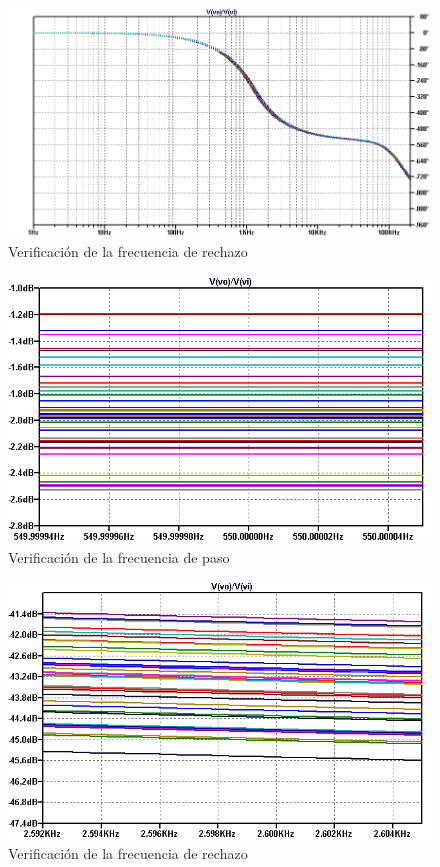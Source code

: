 \begin{figure}[H]
	\centering
	\includegraphics[scale=0.6]{../EJ1/Recursos/bessel_verificacion_fase.png}
	\caption{Verificaci\'on de la frecuencia de rechazo}
\end{figure}

\begin{figure}[H]
	\centering
	\includegraphics[scale=0.6]{../EJ1/Recursos/bessel_verificacion_fp.png}
	\caption{Verificaci\'on de la frecuencia de paso}
\end{figure}

\begin{figure}[H]
	\centering
	\includegraphics[scale=0.6]{../EJ1/Recursos/bessel_verificacion_fa.png}
	\caption{Verificaci\'on de la frecuencia de rechazo}
\end{figure}

